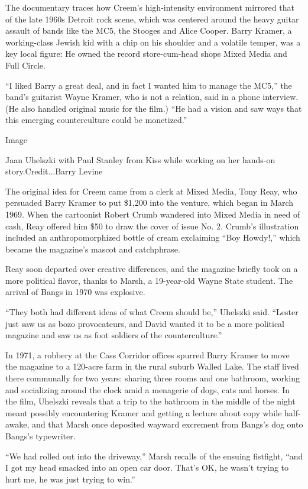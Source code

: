 The documentary traces how Creem's high-intensity environment mirrored
that of the late 1960s Detroit rock scene, which was centered around the
heavy guitar assault of bands like the MC5, the Stooges and Alice
Cooper. Barry Kramer, a working-class Jewish kid with a chip on his
shoulder and a volatile temper, was a key local figure: He owned the
record store-cum-head shops Mixed Media and Full Circle.

``I liked Barry a great deal, and in fact I wanted him to manage the
MC5,'' the band's guitarist Wayne Kramer, who is not a relation, said in
a phone interview. (He also handled original music for the film.) ``He
had a vision and saw ways that this emerging counterculture could be
monetized.''

Image

Jaan Uhelszki with Paul Stanley from Kiss while working on her hands-on
story.Credit...Barry Levine

The original idea for Creem came from a clerk at Mixed Media, Tony Reay,
who persuaded Barry Kramer to put \$1,200 into the venture, which began
in March 1969. When the cartoonist Robert Crumb wandered into Mixed
Media in need of cash, Reay offered him \$50 to draw the cover of issue
No. 2. Crumb's illustration included an anthropomorphized bottle of
cream exclaiming ``Boy Howdy!,'' which became the magazine's mascot and
catchphrase.

Reay soon departed over creative differences, and the magazine briefly
took on a more political flavor, thanks to Marsh, a 19-year-old Wayne
State student. The arrival of Bangs in 1970 was explosive.

``They both had different ideas of what Creem should be,'' Uhelszki
said. ``Lester just saw us as bozo provocateurs, and David wanted it to
be a more political magazine and saw us as foot soldiers of the
counterculture.''

In 1971, a robbery at the Cass Corridor offices spurred Barry Kramer to
move the magazine to a 120-acre farm in the rural suburb Walled Lake.
The staff lived there communally for two years: sharing three rooms and
one bathroom, working and socializing around the clock amid a menagerie
of dogs, cats and horses. In the film, Uhelszki reveals that a trip to
the bathroom in the middle of the night meant possibly encountering
Kramer and getting a lecture about copy while half-awake, and that Marsh
once deposited wayward excrement from Bangs's dog onto Bangs's
typewriter.

``We had rolled out into the driveway,'' Marsh recalls of the ensuing
fistfight, ``and I got my head smacked into an open car door. That's OK,
he wasn't trying to hurt me, he was just trying to win.''

